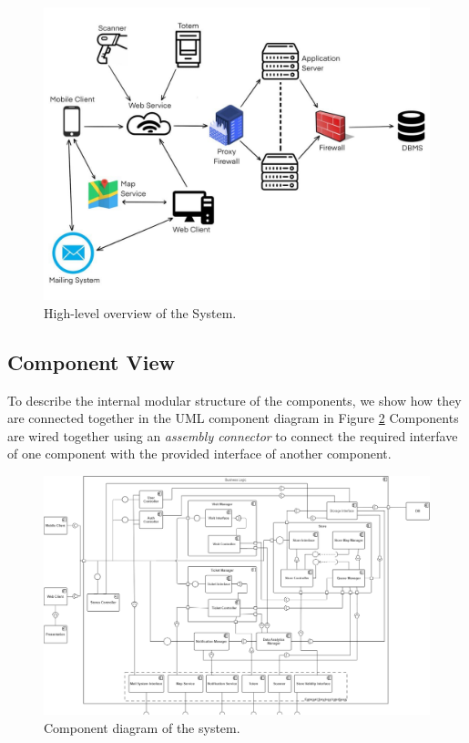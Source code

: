 \documentclass[a4paper, 12pt, oneside, table]{article}
\begin{document}
\begin{figure}[h!]
\centering
    \centering
    \includegraphics[height=0.4\textheight, scale=0.3, keepaspectratio]{img/high_level_overview.jpg}
    \caption{High-level overview of the System.}
    \label{high_level_overview_img}
\end{figure}

\subsection{Component View}
To describe the internal modular structure of the components, we show how they are connected together in the UML component diagram in Figure \ref{comp_view_img} Components are wired together using an \textit{assembly connector} to connect the required interfave of one component with the provided interface of another component.

\begin{figure}[hbt]
\centering
    \centering
    \includegraphics[height=0.4\textheight, scale=0.2, keepaspectratio]{img/component_view.png}
    \caption{Component diagram of the system.}
    \label{comp_view_img}
\end{figure}
\end{document}
